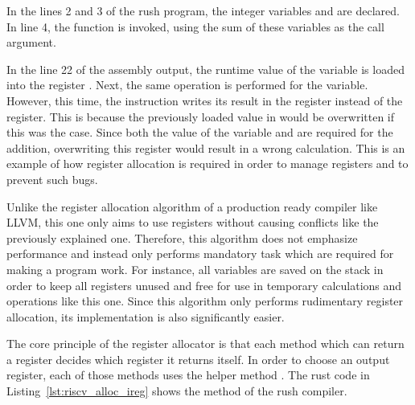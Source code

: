 In the lines 2 and 3 of the rush program, the integer variables  and  are declared.
In line 4, the  function is invoked, using the sum of these variables as the call argument.

In the line 22 of the assembly output, the runtime value of the  variable is loaded into the register .
Next, the same operation is performed for the  variable.
However, this time, the instruction writes its result in the  register instead of the  register.
This is because the previously loaded value in  would be overwritten if this was the case.
Since both the value of the variable  and  are required for the addition, overwriting this register would result in a wrong calculation.
This is an example of how register allocation is required in order to manage registers and to prevent such bugs.

Unlike the register allocation algorithm of a production ready compiler like LLVM, this one only aims to use registers without causing conflicts like the previously explained one.
Therefore, this algorithm does not emphasize performance and instead only performs mandatory task which are required for making a program work.
For instance, all variables are saved on the stack in order to keep all registers unused and free for use in temporary calculations and operations like this one.
Since this algorithm only performs rudimentary register allocation, its implementation is also significantly easier.

The core principle of the register allocator is that each method which can return a register decides which register it returns itself.
In order to choose an output register, each of those methods uses the helper method .
The rust code in Listing~\ref{lst:riscv_alloc_ireg} shows the  method of the \riscv{} rush compiler.


